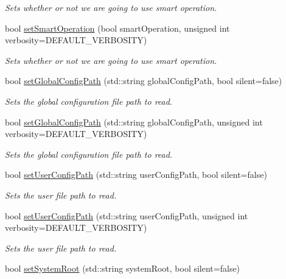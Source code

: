 \begin{DoxyCompactItemize}
\begin{DoxyCompactList}\small\item\em Sets whether or not we are going to use smart operation. \end{DoxyCompactList}\item 
bool \mbox{\hyperlink{classOptions_a0f24b215a0b6d46e3ef31c27766fb1de}{set\+Smart\+Operation}} (bool smart\+Operation, unsigned int verbosity=D\+E\+F\+A\+U\+L\+T\+\_\+\+V\+E\+R\+B\+O\+S\+I\+TY)
\begin{DoxyCompactList}\small\item\em Sets whether or not we are going to use smart operation. \end{DoxyCompactList}\item 
bool \mbox{\hyperlink{classOptions_a46eafded0a6dd4657fcb6da1f9b5fdcd}{set\+Global\+Config\+Path}} (std\+::string global\+Config\+Path, bool silent=false)
\begin{DoxyCompactList}\small\item\em Sets the global configuration file path to read. \end{DoxyCompactList}\item 
bool \mbox{\hyperlink{classOptions_a641d24b137d0c815613b74e42eadcb25}{set\+Global\+Config\+Path}} (std\+::string global\+Config\+Path, unsigned int verbosity=D\+E\+F\+A\+U\+L\+T\+\_\+\+V\+E\+R\+B\+O\+S\+I\+TY)
\begin{DoxyCompactList}\small\item\em Sets the global configuration file path to read. \end{DoxyCompactList}\item 
bool \mbox{\hyperlink{classOptions_af805c5c522132ece2c5da36aa797a64f}{set\+User\+Config\+Path}} (std\+::string user\+Config\+Path, bool silent=false)
\begin{DoxyCompactList}\small\item\em Sets the user file path to read. \end{DoxyCompactList}\item 
bool \mbox{\hyperlink{classOptions_af17a3e422800b36d8900c5bf0f794317}{set\+User\+Config\+Path}} (std\+::string user\+Config\+Path, unsigned int verbosity=D\+E\+F\+A\+U\+L\+T\+\_\+\+V\+E\+R\+B\+O\+S\+I\+TY)
\begin{DoxyCompactList}\small\item\em Sets the user file path to read. \end{DoxyCompactList}\item 
bool \mbox{\hyperlink{classOptions_a506f540031ba61c2aec277b9aecd47ad}{set\+System\+Root}} (std\+::string system\+Root, bool silent=false)

\end{DoxyCompactItemize}
